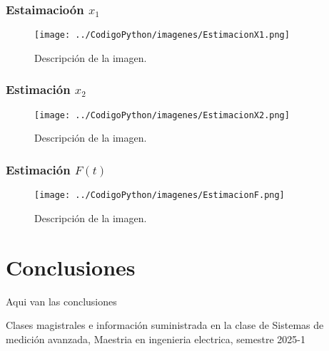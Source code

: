 \documentclass[conference]{IEEEtran}
\begin{document}
\subsubsection{Estaimacio\'on $x_1$}

\begin{figure}[h]
	\centering
	\texttt{[image: ../CodigoPython/imagenes/EstimacionX1.png]}
	\caption{Descripción de la imagen.}
	\label{fig:etiqueta}
\end{figure}

\subsubsection{Estimaci\'on $x_2$}
\begin{figure}[h]
	\centering
	\texttt{[image: ../CodigoPython/imagenes/EstimacionX2.png]}
	\caption{Descripción de la imagen.}
	\label{fig:etiqueta}
\end{figure}

\subsubsection{Estimaci\'on $F(t)$}
\begin{figure}[h]
	\centering
	\texttt{[image: ../CodigoPython/imagenes/EstimacionF.png]}
	\caption{Descripción de la imagen.}
	\label{fig:etiqueta}
\end{figure}

\section{Conclusiones}

Aqui van las conclusiones

\begin{thebibliography}{00}

	\item Clases magistrales e información suministrada en la clase de Sistemas de medición avanzada, Maestria en ingenieria electrica, semestre 2025-1

\end{thebibliography}
\end{document}
